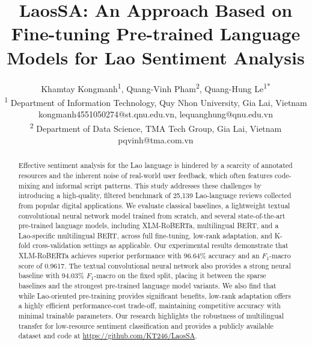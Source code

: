 \documentclass[conference, onecolumn]{IEEEtran}
\begin{document}
\title{LaosSA: An Approach Based on Fine-tuning Pre-trained Language Models for Lao Sentiment Analysis}

\author{
\begin{tabular}{c}
Khamtay Kongmanh\textsuperscript{1}, Quang-Vinh Pham\textsuperscript{2}, Quang-Hung Le\textsuperscript{1*} \\[0.55em]
\small \textsuperscript{1} Department of Information Technology, Quy Nhon University, Gia Lai, Vietnam \\
\small kongmanh4551050274@st.qnu.edu.vn, lequanghung@qnu.edu.vn \\[0.45em]
\small \textsuperscript{2} Department of Data Science, TMA Tech Group, Gia Lai, Vietnam \\
\small pqvinh@tma.com.vn
\end{tabular}
}
\maketitle

\begin{abstract}
Effective sentiment analysis for the Lao language is hindered by a scarcity of annotated resources and the inherent noise of real-world user feedback, which often features code-mixing and informal script patterns. This study addresses these challenges by introducing a high-quality, filtered benchmark of 25,139 Lao-language reviews collected from popular digital applications. We evaluate classical baselines, a lightweight textual convolutional neural network model trained from scratch, and several state-of-the-art pre-trained language models, including XLM-RoBERTa, multilingual BERT, and a Lao-specific multilingual BERT, across full fine-tuning, low-rank adaptation, and K-fold cross-validation settings as applicable. Our experimental results demonstrate that XLM-RoBERTa achieves superior performance with 96.64\% accuracy and an $F_1$-macro score of 0.9617. The textual convolutional neural network also provides a strong neural baseline with 94.03\% $F_1$-macro on the fixed split, placing it between the sparse baselines and the strongest pre-trained language model variants. We also find that while Lao-oriented pre-training provides significant benefits, low-rank adaptation offers a highly efficient performance-cost trade-off, maintaining competitive accuracy with minimal trainable parameters. Our research highlights the robustness of multilingual transfer for low-resource sentiment classification and provides a publicly available dataset and code at \url{https://github.com/KT246/LaosSA}.
\end{abstract}
\end{document}
